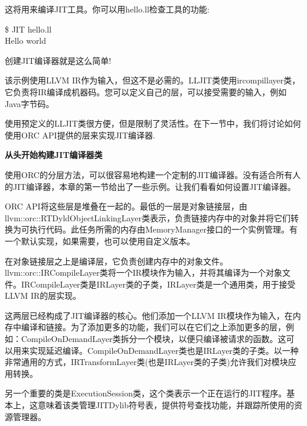 这将用来编译JIT工具。你可以用hello.ll检查工具的功能:\par

\begin{tcolorbox}[colback=white,colframe=black]
\$ JIT hello.ll \\
Hello world
\end{tcolorbox}

创建JIT编译器就是这么简单!\par

该示例使用LLVM IR作为输入，但这不是必需的。LLJIT类使用ircompillayer类，它负责将IR编译成机器码。您可以定义自己的层，可以接受需要的输入，例如Java字节码。\par

使用预定义的LLJIT类很方便，但是限制了灵活性。在下一节中，我们将讨论如何使用ORC API提供的层来实现JIT编译器.\par

\hspace*{\fill} \par %
\textbf{从头开始构建JIT编译器类}

使用ORC的分层方法，可以很容易地构建一个定制的JIT编译器。没有适合所有人的JIT编译器，本章的第一节给出了一些示例。让我们看看如何设置JIT编译器。\par

ORC API将这些层是堆叠在一起的。最低的一层是对象链接层，由llvm::orc::RTDyldObject\allowbreak LinkingLayer类表示，负责链接内存中的对象并将它们转换为可执行代码。此任务所需的内存由MemoryManager接口的一个实例管理。有一个默认实现，如果需要，也可以使用自定义版本。\par

在对象链接层之上是编译层，它负责创建内存中的对象文件。llvm::orc::IRCompileLayer类将一个IR模块作为输入，并将其编译为一个对象文件。IRCompileLayer类是IRLayer类的子类，IRLayer类是一个通用类，用于接受LLVM IR的层实现。\par

这两层已经构成了JIT编译器的核心。他们添加一个LLVM IR模块作为输入，在内存中编译和链接。为了添加更多的功能，我们可以在它们之上添加更多的层，例如：CompileOnDemandLayer类拆分一个模块，以便只编译被请求的函数。这可以用来实现延迟编译。CompileOnDemandLayer类也是IRLayer类的子类。以一种非常通用的方式，IRTransformLayer类(也是IRLayer类的子类)允许我们对模块应用转换。\par

另一个重要的类是ExecutionSession类，这个类表示一个正在运行的JIT程序。基本上，这意味着该类管理JITDylib符号表，提供符号查找功能，并跟踪所使用的资源管理器。\par


